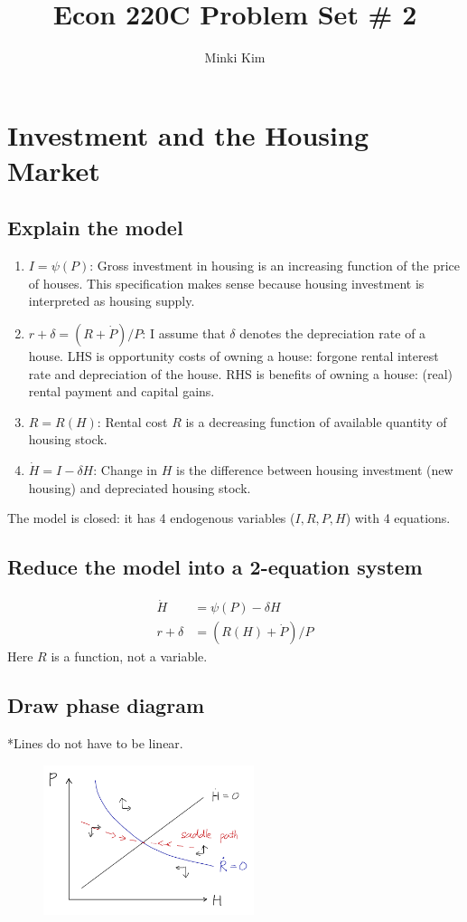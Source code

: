 \documentclass[11pt]{amsart}
\title{Econ 220C Problem Set \# 2}
\author{Minki Kim}
\begin{document}
\maketitle

\section{Investment and the Housing Market}
\subsection{Explain the model}
\begin{enumerate}
	\item $I = \psi (P)$: Gross investment in housing is an increasing function of the price of houses. This specification makes sense because housing investment is interpreted as housing supply. 
	\item $r + \delta = (R + \dot{P})/P$: I assume that $\delta$ denotes the depreciation rate of a house. LHS is opportunity costs of owning a house: forgone rental interest rate and depreciation of the house. RHS is benefits of owning a house: (real) rental payment and capital gains. 
	\item $R = R(H)$: Rental cost $R$ is a decreasing function of available quantity of housing stock. 
	\item $\dot{H} = I - \delta H$: Change in $H$ is the difference between housing investment (new housing) and depreciated housing stock. 
\end{enumerate}
The model is closed: it has 4 endogenous variables ($I,R,P,H$) with 4 equations.

\subsection{Reduce the model into a 2-equation system}
\begin{align*}
\dot{H} &= \psi(P) - \delta H \\
r + \delta &= (R(H) + \dot{P}) / P
\end{align*}
Here $R$ is a function, not a variable. 
\subsection{Draw phase diagram}
*Lines do not have to be linear. 
\begin{figure}[H]
	\centering
	\includegraphics[width=0.55\textwidth]{1c_Minki.png}
\end{figure}
\end{document}
